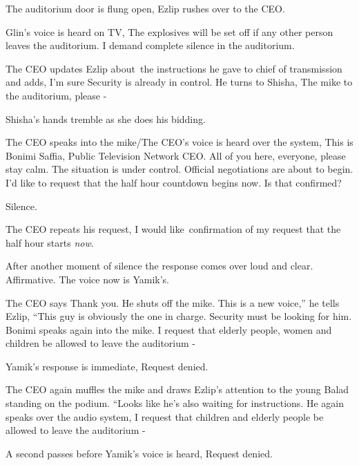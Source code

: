 \documentclass[letterpaper]{article}
\begin{document}
The auditorium door is flung open, Ezlip rushes over to the CEO.

Glin's voice is heard on TV, {\textquotedbl}The explosives will be set off if any other person leaves the auditorium. I
demand complete silence in the auditorium.{\textquotedbl}

The CEO updates Ezlip about~the instructions he gave to chief of transmission and adds, {\textquotedbl}I'm sure Security
is already in control.{\textquotedbl} He turns to Shisha, {\textquotedbl}The mike to the auditorium, please
-{\textquotedbl} 

Shisha's hands tremble as she does his bidding.

The CEO speaks into the mike/\textcolor[rgb]{0.0,0.4392157,0.7529412}{The CEO's voice is heard over the system},
{\textquotedbl}This is Bonimi Saffia, Public Television Network CEO. All of you here, everyone, please stay calm. The
situation is under control. Official negotiations are about to\textcolor[rgb]{0.0,0.4392157,0.7529412}{ }begin. I'd
like to request that the half hour\textcolor{red}{ }countdown\textcolor{red}{ }begins now. Is that
confirmed?{\textquotedbl}

Silence.

The CEO repeats his request, {\textquotedbl}I would like~confirmation of my request that the half hour starts
\textit{now}.{\textquotedbl}

After another moment of silence the response comes over loud and clear. {\textquotedbl}Affirmative.{\textquotedbl} The
voice now is Yamik's.

The CEO says {\textquotedbl}Thank you.{\textquotedbl} He shuts off the mike. {\textquotedbl}This is a new voice,'' he
tells Ezlip, ``This guy is\textcolor[rgb]{0.0,0.4392157,0.7529412}{ }obviously the one in charge. Security must
be\textcolor{red}{ }looking for him.{\textquotedbl} Bonimi speaks again into the\textcolor{red}{ }mike.
{\textquotedbl}I request that elderly people, women and children be allowed to leave the auditorium -{\textquotedbl}

Yamik's response is immediate, {\textquotedbl}Request denied.{\textquotedbl}

The CEO again muffles the mike and draws Ezlip's attention to the young Balad standing on the podium. ``Looks like he's
also waiting for instructions.{\textquotedbl} He again speaks over the audio system, {\textquotedbl}I request that
children and elderly people be allowed to leave the auditorium -{\textquotedbl}

A second passes before Yamik's voice is heard, {\textquotedbl}Request denied.{\textquotedbl}
\end{document}
